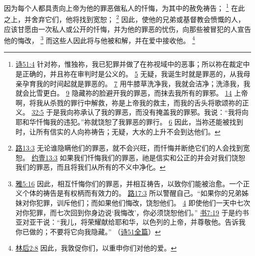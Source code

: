 \documentclass[12pt, a4paper, oneside]{ctexart}
\newcounter{parnum}[section]
\newcommand{\N}{%
   \noindent\refstepcounter{parnum}%
    \makebox[\parindent][l]{\textbf{\arabic{parnum}.}}}
\begin{document}
\N 因为每个人都具责向上帝为他的罪恶做私人的忏悔，为其中的赦免祷告；
	\footnote {
		\href{https://biblehub.com/psalms/51-4.htm}{诗51:4} 针对祢，惟独祢，我已犯罪并做了在祢视域中的恶事；所以祢在裁定中是正确的，并且祢在审判时是公义的。
		\href{https://biblehub.com/psalms/51-5.htm}{5} 无疑，我诞生时就是罪恶的，从我母亲孕育我的时间起就是罪恶的。
        \href{https://biblehub.com/psalms/51-7.htm}{7} 用牛膝草洗净我，我就会洁净；洗涤我，我就会比雪更白。
        \href{https://biblehub.com/psalms/51-9.htm}{9} 隐藏祢的脸避开我的罪恶，而抹去我所有的罪邪。
		\href{https://biblehub.com/psalms/51-14.htm}{14} 上帝啊，将我从杀戮的罪行中解救，祢是上帝我的救主，而我的舌头将歌颂祢的正义。
		\href{https://biblehub.com/psalms/32-5.htm}{32:5} 于是我向祢承认了我的罪恶，而没有掩盖我的罪邪。我说：“我将向耶和华忏悔我的违犯。”祢就饶恕了我罪恶的罪行。
		\href{https://biblehub.com/psalms/32-6.htm}{6} 因此，当祢还能被找到时，让所有信实的人向祢祷告；无疑，大水的上升不会到达他们。
	}
	在此之上，并舍弃它们，他将找到宽恕；
	\footnote {
		\href{https://biblehub.com/proverbs/28-13.htm}{路13:3} 无论谁隐瞒他们的罪恶，就不会兴旺，而忏悔并断绝它们的人会找到宽恕。
		\href{https://biblehub.com/1_john/1-9.htm}{约壹13:3} 如果我们忏悔我们的罪恶，祂是信实和公正的并会对我们饶恕我们的罪恶，而且将我们从所有的不义中净化。
	}
	因此，使他的兄弟或基督教会愤慨的人，应该甘愿由一次私人或公开的忏悔，并为他的罪恶的忧伤，向那些被冒犯的人宣告他的悔改，
	\footnote {
		\href{https://biblehub.com/james/5-16.htm}{雅5:16} 因此，相互忏悔你们的罪恶，并相互祷告，以致你们能被治愈。一个正义个体的祷告是有权柄而有效力的。
		\href{https://biblehub.com/luke/17-3.htm}{路17:3} 所以警醒自己。“如果你的兄弟姊妹对你犯罪，训斥他们；而如果他们悔改，饶恕他们。
		\href{https://biblehub.com/luke/17-4.htm}{4} 即使他们一天中七次对你犯罪，而七次回到你身边说‘我悔改’，你必须饶恕他们。”
		\href{https://biblehub.com/joshua/7-19.htm}{书7:19} 于是约书亚对亚干说：“我儿，将荣耀献给耶和华，以色列的上帝，并尊敬他。告诉我你已做的；不要将它向我隐藏。”
		（\href{https://biblehub.com/niv/psalms/51.htm}{诗51全篇}）
	}
	而这些人因此将与他被和解，并在爱中接收他。
	\footnote {
		\href{https://biblehub.com/2_corinthians/2-8.htm}{林后2:8} 因此，我敦促你们，以重申你们对他的爱。
	}
\end{document}
